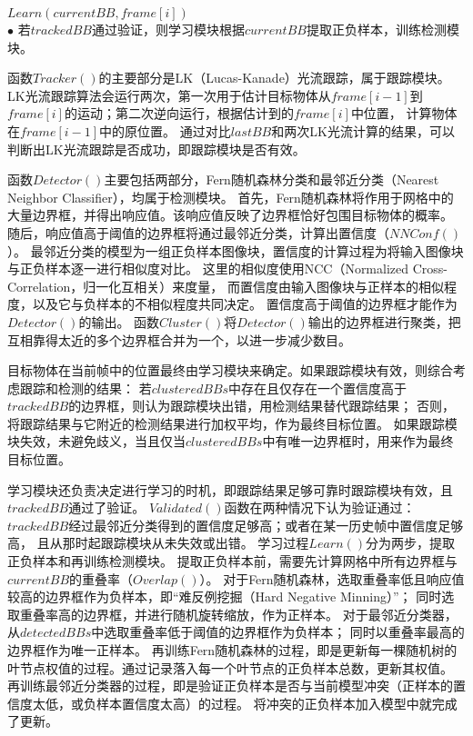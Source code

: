 \begin{algorithm}[htbp]
\begin{algorithmic}[1]
    \STATE $ Learn( currentBB, frame[i] )  $
    \ENDIF
    \\ $\bullet$ 若$trackedBB$通过验证，则学习模块根据$currentBB$提取正负样本，训练检测模块。
  \end{algorithmic}
\end{algorithm}

函数$Tracker()$的主要部分是LK（Lucas-Kanade）光流跟踪，属于跟踪模块。
LK光流跟踪算法会运行两次，第一次用于估计目标物体从$frame[i-1]$到$frame[i]$的运动；第二次逆向运行，根据估计到的$frame[i]$中位置，
计算物体在$frame[i-1]$中的原位置。
通过对比$lastBB$和两次LK光流计算的结果，可以判断出LK光流跟踪是否成功，即跟踪模块是否有效。


函数$Detector()$主要包括两部分，Fern随机森林分类和最邻近分类（Nearest Neighbor Classifier），均属于检测模块。
首先，Fern随机森林将作用于网格中的大量边界框，并得出响应值。该响应值反映了边界框恰好包围目标物体的概率。
随后，响应值高于阈值的边界框将通过最邻近分类，计算出置信度（$NNConf()$）。
最邻近分类的模型为一组正负样本图像块，置信度的计算过程为将输入图像块与正负样本逐一进行相似度对比。
这里的相似度使用NCC（Normalized Cross-Correlation，归一化互相关）来度量，
而置信度由输入图像块与正样本的相似程度，以及它与负样本的不相似程度共同决定。
置信度高于阈值的边界框才能作为$Detector()$的输出。
函数$Cluster()$将$Detector()$输出的边界框进行聚类，把互相靠得太近的多个边界框合并为一个，以进一步减少数目。

目标物体在当前帧中的位置最终由学习模块来确定。如果跟踪模块有效，则综合考虑跟踪和检测的结果：
若$clusteredBBs$中存在且仅存在一个置信度高于$trackedBB$的边界框，则认为跟踪模块出错，用检测结果替代跟踪结果；
否则，将跟踪结果与它附近的检测结果进行加权平均，作为最终目标位置。
如果跟踪模块失效，未避免歧义，当且仅当$clusteredBBs$中有唯一边界框时，用来作为最终目标位置。

学习模块还负责决定进行学习的时机，即跟踪结果足够可靠时\pozhehao 跟踪模块有效，且$trackedBB$通过了验证。
$Validated()$函数在两种情况下认为验证通过：$trackedBB$经过最邻近分类得到的置信度足够高；或者在某一历史帧中置信度足够高，
且从那时起跟踪模块从未失效或出错。
学习过程$Learn()$分为两步，提取正负样本和再训练检测模块。
提取正负样本前，需要先计算网格中所有边界框与$currentBB$的重叠率（$Overlap()$）。
对于Fern随机森林，选取重叠率低且响应值较高的边界框作为负样本，即``难反例挖掘（Hard Negative Minning）''；
同时选取重叠率高的边界框，并进行随机旋转缩放，作为正样本。
对于最邻近分类器，从$detectedBBs$中选取重叠率低于阈值的边界框作为负样本；
同时以重叠率最高的边界框作为唯一正样本。
再训练Fern随机森林的过程，即是更新每一棵随机树的叶节点权值的过程。通过记录落入每一个叶节点的正负样本总数，更新其权值。
再训练最邻近分类器的过程，即是验证正负样本是否与当前模型冲突（正样本的置信度太低，或负样本置信度太高）的过程。
将冲突的正负样本加入模型中就完成了更新。

